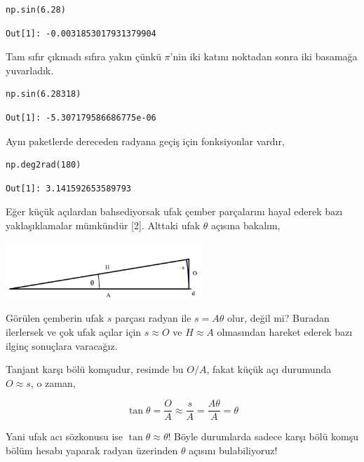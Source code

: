 \documentclass[12pt,fleqn]{article}\usepackage{../../common}
\begin{document}
\begin{verbatim}
np.sin(6.28)
\end{verbatim}

\begin{verbatim}
Out[1]: -0.0031853017931379904
\end{verbatim}

Tam sıfır çıkmadı sıfıra yakın çünkü $\pi$'nin iki katını noktadan sonra iki
basamağa yuvarladık.

\begin{verbatim}
np.sin(6.28318)
\end{verbatim}

\begin{verbatim}
Out[1]: -5.307179586686775e-06
\end{verbatim}

Aynı paketlerde dereceden radyana geçiş için fonksiyonlar vardır,

\begin{verbatim}
np.deg2rad(180)
\end{verbatim}

\begin{verbatim}
Out[1]: 3.141592653589793
\end{verbatim}

Eğer küçük açılardan bahsediyorsak ufak çember parçalarını hayal ederek bazı
yaklaşıklamalar mümkündür [2]. Alttaki ufak $\theta$ açısına bakalım,

\includegraphics[width=20em]{ode_mattuck_50_trig_06.jpg}

Görülen çemberin ufak $s$ parçası radyan ile $s = A \theta$ olur, değil mi?
Buradan ilerlersek ve çok ufak açılar için $s \approx O$ ve $H \approx A$
olmasından hareket ederek bazı ilginç sonuçlara varacağız.

Tanjant karşı bölü komşudur, resimde bu $O / A$, fakat küçük açı durumunda
$O \approx s$, o zaman, 

$$
\tan \theta = \frac{O}{A} \approx \frac{s}{A} = \frac{A\theta}{A} = \theta
$$

Yani ufak acı sözkonusu ise $\tan \theta \approx \theta$! Böyle durumlarda
sadece karşı bölü komşu bölüm hesabı yaparak radyan üzerinden $\theta$
açısını bulabiliyoruz!
\end{document}
